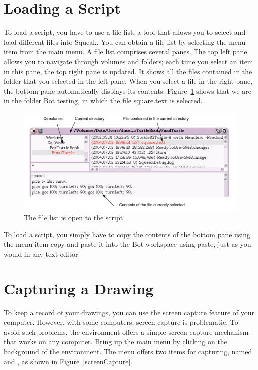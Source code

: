 \documentclass[a4paper,10pt,twoside]{book}
\begin{document}
\section{Loading a Script}

To load a script, you have to use a file list, a tool that allows you to select and load different 
files into Squeak. You can obtain a file list by selecting the menu item  from 
the main menu. A file list comprises several panes. The top left pane allows you to navigate 
through volumes and folders; each time you select an item in this pane, the top right pane is 
updated. It shows all the files contained in the folder that you selected in the left pane. When 
you select a file in the right pane, the bottom pane automatically displays its contents. Figure~\ref{fig:filelistOpen} shows that we are in the folder Bot testing, in which the file 
\textsf{square.text} is selected. 


\begin{figure}[h]\begin{center}
\includegraphics[width=12cm]{filelistOpenAnnotated}
\caption{The file list is open to the script .\label{fig:filelistOpen}}\end{center}
\end{figure}

 

To load a script, you simply have to copy the contents of the bottom pane using the menu 
item copy and paste it into the Bot workspace using paste, just as you would in any text editor. 

\section{Capturing a Drawing}

To keep a record of your drawings, you can use the screen capture feature of your computer. 
However, with some computers, screen capture is problematic. To avoid such problems, the 
environment offers a simple screen capture mechanism that works on any computer. Bring up 
the main menu by clicking on the background of the environment. The menu offers two items 
for capturing, named  and , as shown in Figure~\ref{screenCapture}. 
\end{document}
